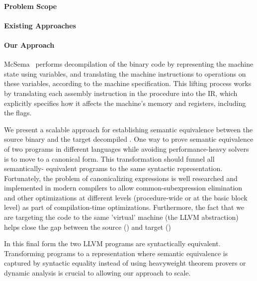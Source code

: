 \paragraph{Problem Scope}


\paragraph{Existing Approaches}

\paragraph{Our Approach}

McSema~\cite{McSema:Recon14} performs decompilation of the binary code by representing the machine state using variables, and translating the machine instructions to operations on these variables, according to the machine specification. This lifting process works by translating each assembly instruction in the procedure into the IR, which explicitly specifies how it affects the machine's memory and registers, including the flags.

We present a scalable approach for establishing semantic equivalence between the source binary and the target decompiled \LLVM.
One way to prove semantic equivalence of two programs in different languages while avoiding performance-heavy solvers is to move to a canonical form. This transformation should funnel all semantically- equivalent programs to the same syntactic representation. Fortunately, the problem of canonicalizing expressions is well researched and implemented in modern compilers to allow common-subexpression elimination and other optimizations at different levels (procedure-wide or at the basic block level) as part of compilation-time optimizations.   
Furthermore, the fact that we are targeting the code to the same 'virtual' machine (the LLVM abstraction) helps close the gap between the source (\ISA) and target (\LLVM)

In this final form the two LLVM programs are syntactically equivalent. Transforming programs to a representation where semantic equivalence is captured by syntactic equality instead of using heavyweight theorem provers or dynamic analysis is crucial to allowing our approach to scale.





